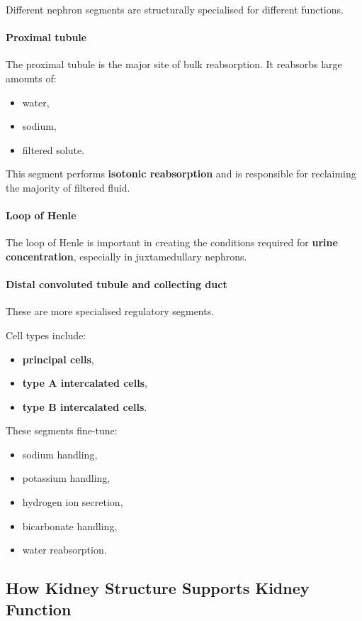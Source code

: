 \documentclass[11pt,a4paper]{article}
\begin{document}
Different nephron segments are structurally specialised for different functions.

\paragraph{Proximal tubule}
The proximal tubule is the major site of bulk reabsorption. It reabsorbs large amounts of:
\begin{itemize}
    \item water,
    \item sodium,
    \item filtered solute.
\end{itemize}

This segment performs \textbf{isotonic reabsorption} and is responsible for reclaiming the majority of filtered fluid.

\paragraph{Loop of Henle}
The loop of Henle is important in creating the conditions required for \textbf{urine concentration}, especially in juxtamedullary nephrons.

\paragraph{Distal convoluted tubule and collecting duct}
These are more specialised regulatory segments.

Cell types include:
\begin{itemize}
    \item \textbf{principal cells},
    \item \textbf{type A intercalated cells},
    \item \textbf{type B intercalated cells}.
\end{itemize}

These segments fine-tune:
\begin{itemize}
    \item sodium handling,
    \item potassium handling,
    \item hydrogen ion secretion,
    \item bicarbonate handling,
    \item water reabsorption.
\end{itemize}

\subsection{How Kidney Structure Supports Kidney Function}
\end{document}

